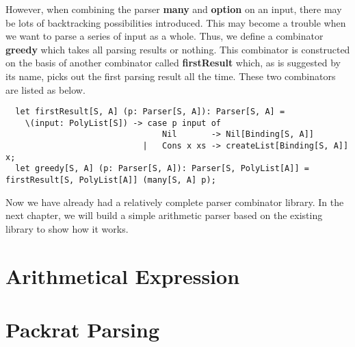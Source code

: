 However, when combining the parser \textbf{many} and \textbf{option} on an input, there may be lots of backtracking possibilities introduced. This may become a trouble when we want to parse a series of input as a whole. Thus, we define a combinator \textbf{greedy} which takes all parsing results or nothing. This combinator is constructed on the basis of another combinator called \textbf{firstResult} which, as is suggested by its name, picks out the first parsing result all the time. These two combinators are listed as below.
\begin{lstlisting}
  let firstResult[S, A] (p: Parser[S, A]): Parser[S, A] =
	\(input: PolyList[S]) -> case p input of
								Nil 	  -> Nil[Binding[S, A]]
							|	Cons x xs -> createList[Binding[S, A]] x;
  let greedy[S, A] (p: Parser[S, A]): Parser[S, PolyList[A]] = firstResult[S, PolyList[A]] (many[S, A] p);
\end{lstlisting}
Now we have already had a relatively complete parser combinator library. In the next chapter, we will build a simple arithmetic parser based on the existing library to show how it works.

\section{Arithmetical Expression}

\section{Packrat Parsing}